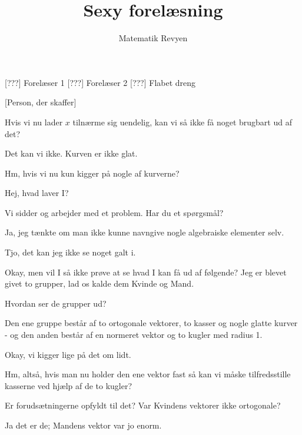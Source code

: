 \documentclass[a4paper,11pt]{article}
\title{Sexy forelæsning}
\author{Matematik Revyen}
\begin{document}
\maketitle

\begin{roles}
[???] Forelæser 1
[???] Forelæser 2
[???] Flabet dreng
\end{roles}

\begin{props}
[Person, der skaffer]
\end{props}

\begin{sketch}

 Hvis vi nu lader $x$ tilnærme sig uendelig, kan vi så ikke få noget brugbart ud af det?

 Det kan vi ikke. Kurven er ikke glat.

 Hm, hvis vi nu kun kigger på nogle af kurverne?


 Hej, hvad laver I?

 Vi sidder og arbejder med et problem. Har du et spørgsmål?

 Ja, jeg tænkte om man ikke kunne navngive nogle algebraiske elementer selv.

 Tjo, det kan jeg ikke se noget galt i.

 Okay, men vil I så ikke prøve at se hvad I kan få ud af følgende? Jeg er blevet givet to grupper, lad os kalde dem Kvinde og Mand.

 Hvordan ser de grupper ud?

 Den ene gruppe består af to ortogonale vektorer, to kasser og nogle glatte kurver - og den anden består af en normeret vektor og to kugler med radius 1.

 Okay, vi kigger lige på det om lidt.


 Hm, altså, hvis man nu holder den ene vektor fast så kan vi måske tilfredsstille kasserne ved hjælp af de to kugler?

 Er forudsætningerne opfyldt til det? Var Kvindens vektorer ikke ortogonale?

 Ja det er de; Mandens vektor var jo enorm.
\end{sketch}
\end{document}
